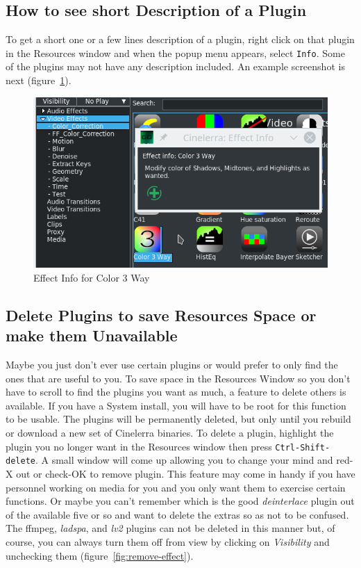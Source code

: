 \subsection{How to see short Description of a Plugin}%
\label{sub:short_description_plugin}

To get a short one or a few lines description of a plugin, right click on that plugin in the Resources window and when the popup menu appears, select \texttt{Info}. Some of the plugins may not have any description included. An example screenshot is next (figure~\ref{fig:info-effect}).

\begin{figure}[htpb]
    \centering
    \includegraphics[width=0.7\linewidth]{images/info-effect.png}
    \caption{Effect Info for Color 3 Way}
    \label{fig:info-effect}
\end{figure}

\subsection{Delete Plugins to save Resources Space or make them Unavailable}%
\label{sub:delete_plugin_resouces_unavaible}

Maybe you just don't ever use certain plugins or would prefer to only find the ones that are useful to you. To save space in the Resources Window so you don't have to scroll to find the plugins you want as much, a feature to delete others is available. If you have a System install, you will have to be root for this function to be usable. The plugins will be permanently deleted, but only until you rebuild or download a new set of Cinelerra binaries. To delete a plugin, highlight the plugin you no longer want in the Resources window then press \texttt{Ctrl-Shift-delete}. A small window will come up allowing you to change your mind and red-X out or check-OK to remove plugin. This feature may come in handy if you have personnel working on media for you and you only want them to exercise certain functions. Or maybe you can't remember which is the good \textit{deinterlace} plugin out of the available five or so and want to delete the extras so as not to be confused. The ffmpeg, \textit{ladspa}, and \textit{lv2} plugins can not be deleted in this manner but, of course, you can always turn them off from view by clicking on \textit{Visibility} and unchecking them (figure~\ref{fig:remove-effect}).

